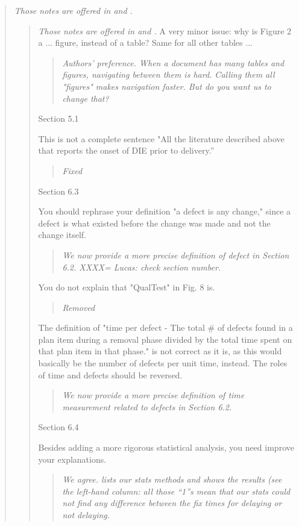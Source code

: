 \begin{quote}{\em 
Those notes are offered in  and .}
\begin{quote}{\em 
Those notes are offered in  and .}
A very minor issue: why is Figure 2 a ... figure, instead of
a table? Same for all other tables ...
\begin{quote}
{\em Authors' preference. When a document has many tables and figures, navigating
between them is hard. Calling them all "figures" makes navigation faster. 
But do you want us to change that?}
\end{quote}
Section 5.1

This is not a complete sentence "All the literature
described above that reports the onset of DIE prior to delivery.''

\begin{quote}
{\em Fixed}
\end{quote}

Section 6.3

You should rephrase your definition "a defect is any change," since a defect is what existed before the change was made and not the change itself.
\begin{quote}
{\em We now provide a more precise definition of defect in Section 6.2.
XXXX= Lucas: check section number.
}
\end{quote} 
You do not explain that "QualTest" in Fig. 8 is.
\begin{quote}
{\em Removed}
\end{quote}
The definition of "time per defect - The total # of defects found in a plan item during a removal phase divided by the total time spent on that plan item in that phase." is not correct as it is, as this would basically be the number of defects per unit time, instead. The roles of time and
defects should be reversed.
\begin{quote}{\em We now provide a more precise definition of time measurement related to defects in Section 6.2.}\end{quote}

 
Section 6.4

Besides adding a more rigorous statistical analysis, you
need improve your explanations.
\begin{quote}{\em We agree.  lists our stats methods and 
shows the results (see the left-hand column: all those ``1''s mean
that our stats could not find any difference between the fix times for
delaying or not delaying.}\end{quote}


\end{quote}
\end{quote}
